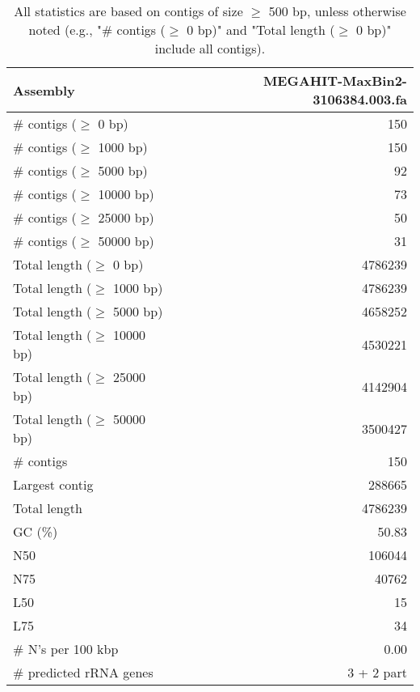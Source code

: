 \documentclass[12pt,a4paper]{article}
\begin{document}
\begin{table}[ht]
\begin{center}
\caption{All statistics are based on contigs of size $\geq$ 500 bp, unless otherwise noted (e.g., "\# contigs ($\geq$ 0 bp)" and "Total length ($\geq$ 0 bp)" include all contigs).}
\begin{tabular}{|l*{1}{|r}|}
\hline
Assembly & MEGAHIT-MaxBin2-3106384.003.fa \\ \hline
\# contigs ($\geq$ 0 bp) & 150 \\ \hline
\# contigs ($\geq$ 1000 bp) & 150 \\ \hline
\# contigs ($\geq$ 5000 bp) & 92 \\ \hline
\# contigs ($\geq$ 10000 bp) & 73 \\ \hline
\# contigs ($\geq$ 25000 bp) & 50 \\ \hline
\# contigs ($\geq$ 50000 bp) & 31 \\ \hline
Total length ($\geq$ 0 bp) & 4786239 \\ \hline
Total length ($\geq$ 1000 bp) & 4786239 \\ \hline
Total length ($\geq$ 5000 bp) & 4658252 \\ \hline
Total length ($\geq$ 10000 bp) & 4530221 \\ \hline
Total length ($\geq$ 25000 bp) & 4142904 \\ \hline
Total length ($\geq$ 50000 bp) & 3500427 \\ \hline
\# contigs & 150 \\ \hline
Largest contig & 288665 \\ \hline
Total length & 4786239 \\ \hline
GC (\%) & 50.83 \\ \hline
N50 & 106044 \\ \hline
N75 & 40762 \\ \hline
L50 & 15 \\ \hline
L75 & 34 \\ \hline
\# N's per 100 kbp & 0.00 \\ \hline
\# predicted rRNA genes & 3 + 2 part \\ \hline
\end{tabular}
\end{center}
\end{table}
\end{document}
